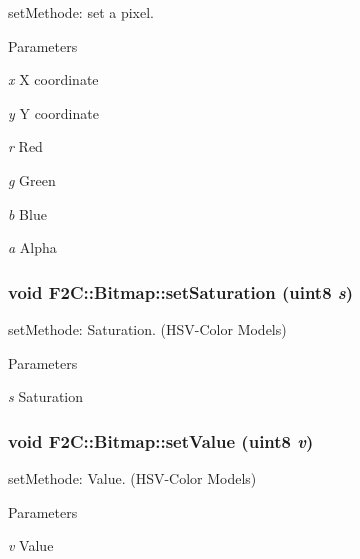 setMethode: set a pixel. 
\begin{DoxyParams}{Parameters}
\item[{\em x}]X coordinate \item[{\em y}]Y coordinate \item[{\em r}]Red \item[{\em g}]Green \item[{\em b}]Blue \item[{\em a}]Alpha \end{DoxyParams}
\hypertarget{class_f2_c_1_1_bitmap_aa97d0cc8fb9421dff34cf5033becd3cc}{
\subsubsection[{setSaturation}]{\setlength{\rightskip}{0pt plus 5cm}void F2C::Bitmap::setSaturation ({\bf uint8} {\em s})}}
\label{class_f2_c_1_1_bitmap_aa97d0cc8fb9421dff34cf5033becd3cc}


setMethode: Saturation. (HSV-\/Color Models) 
\begin{DoxyParams}{Parameters}
\item[{\em s}]Saturation \end{DoxyParams}
\hypertarget{class_f2_c_1_1_bitmap_ae7292dbd7e0c1230eb7832c536327126}{
\subsubsection[{setValue}]{\setlength{\rightskip}{0pt plus 5cm}void F2C::Bitmap::setValue ({\bf uint8} {\em v})}}
\label{class_f2_c_1_1_bitmap_ae7292dbd7e0c1230eb7832c536327126}


setMethode: Value. (HSV-\/Color Models) 
\begin{DoxyParams}{Parameters}
\item[{\em v}]Value \end{DoxyParams}
